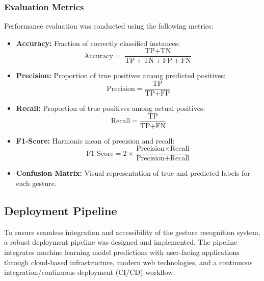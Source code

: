 \documentclass[10pt,twocolumn,letterpaper]{article}
\begin{document}
\subsubsection{Evaluation Metrics}
Performance evaluation was conducted using the following metrics:
\begin{itemize}
    \item \textbf{Accuracy:} Fraction of correctly classified instances:
    \begin{equation}
        \text{Accuracy} = \frac{\text{TP} + \text{TN}}{\text{TP} + \text{TN} + \text{FP} + \text{FN}}
    \end{equation}
    
    \item \textbf{Precision:} Proportion of true positives among predicted positives:
    \begin{equation}
        \text{Precision} = \frac{\text{TP}}{\text{TP} + \text{FP}}
    \end{equation}
    
    \item \textbf{Recall:} Proportion of true positives among actual positives:
    \begin{equation}
        \text{Recall} = \frac{\text{TP}}{\text{TP} + \text{FN}}
    \end{equation}
    
    \item \textbf{F1-Score:} Harmonic mean of precision and recall:
    \begin{equation}
        \text{F1-Score} = 2 \times \frac{\text{Precision} \times \text{Recall}}{\text{Precision} + \text{Recall}}
    \end{equation}
    
    \item \textbf{Confusion Matrix:} Visual representation of true and predicted labels for each gesture.
\end{itemize}



\cite{haseeb2020wisture, abdelnasser2015wifi, wang2017wifi}

\subsection{Deployment Pipeline}

To ensure seamless integration and accessibility of the gesture recognition system, a robust deployment pipeline was designed and implemented. The pipeline integrates machine learning model predictions with user-facing applications through cloud-based infrastructure, modern web technologies, and a continuous integration/continuous deployment (CI/CD) workflow.
\end{document}
